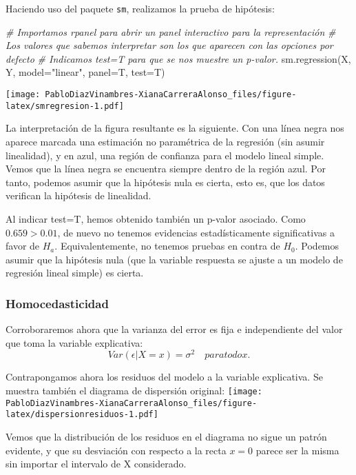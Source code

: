 \documentclass[
]{article}
\newenvironment{Shaded}{\begin{snugshade}}{\end{snugshade}}
\newcommand{\AttributeTok}[1]{\textcolor[rgb]{0.77,0.63,0.00}{#1}}
\newcommand{\CommentTok}[1]{\textcolor[rgb]{0.56,0.35,0.01}{\textit{#1}}}
\newcommand{\FunctionTok}[1]{\textcolor[rgb]{0.00,0.00,0.00}{#1}}
\newcommand{\NormalTok}[1]{#1}
\newcommand{\StringTok}[1]{\textcolor[rgb]{0.31,0.60,0.02}{#1}}
\begin{document}
Haciendo uso del paquete \texttt{sm}, realizamos la prueba de hipótesis:

\begin{Shaded}
\begin{Highlighting}[]
\CommentTok{\# Importamos rpanel para abrir un panel interactivo para la representación}
\CommentTok{\# Los valores que sabemos interpretar son los que aparecen con las opciones por defecto}
\CommentTok{\# Indicamos test=T para que se nos muestre un p{-}valor.}
\FunctionTok{sm.regression}\NormalTok{(X, Y, }\AttributeTok{model=}\StringTok{"linear"}\NormalTok{, }\AttributeTok{panel=}\NormalTok{T, }\AttributeTok{test=}\NormalTok{T)}
\end{Highlighting}
\end{Shaded}

\texttt{[image: PabloDiazVinambres-XianaCarreraAlonso\_files/figure-latex/smregresion-1.pdf]}

La interpretación de la figura resultante es la siguiente. Con una línea
negra nos aparece marcada una estimación no paramétrica de la regresión
(sin asumir linealidad), y en azul, una región de confianza para el
modelo lineal simple. Vemos que la línea negra se encuentra siempre
dentro de la región azul. Por tanto, podemos asumir que la hipótesis
nula es cierta, esto es, que los datos verifican la hipótesis de
linealidad.

Al indicar test=T, hemos obtenido también un p-valor asociado. Como
\(0.659 > 0.01\), de nuevo no tenemos evidencias estadísticamente
significativas a favor de \(H_a\). Equivalentemente, no tenemos pruebas
en contra de \(H_0\). Podemos asumir que la hipótesis nula (que la
variable respuesta se ajuste a un modelo de regresión lineal simple) es
cierta.

\hypertarget{homocedasticidad}{%
\subsubsection{Homocedasticidad}\label{homocedasticidad}}

Corroboraremos ahora que la varianza del error es fija e independiente
del valor que toma la variable explicativa: \[
Var(\epsilon | X = x) = \sigma^2 \quad para todo x.
\]

Contrapongamos ahora los residuos del modelo a la variable explicativa.
Se muestra también el diagrama de dispersión original:
\texttt{[image: PabloDiazVinambres-XianaCarreraAlonso\_files/figure-latex/dispersionresiduos-1.pdf]}

Vemos que la distribución de los residuos en el diagrama no sigue un
patrón evidente, y que su desviación con respecto a la recta \(x=0\)
parece ser la misma sin importar el intervalo de X considerado.
\end{document}
